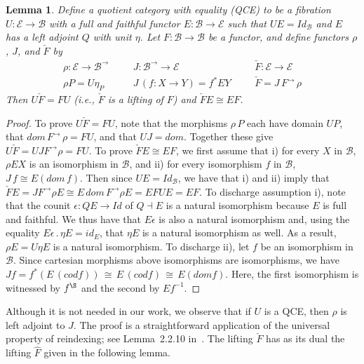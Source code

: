 \documentclass{LMCS}
\newcommand{\ra}{\rightarrow}
\newcommand{\cech}[1]{\check{#1}}
\newcommand\E{{\mathcal E}}
\newcommand\B{{\mathcal B}}
\theoremstyle{plain}
\newtheorem{lemma}[theorem]{Lemma}
\theoremstyle{remark}
\theoremstyle{definition}
\begin{document}
\begin{lemma}\label{lem:coindlift}
  Define a {\em quotient category with equality} (QCE) to be a
  fibration $U:\E\to\B$ with a full and faithful functor $E:\B\to\E$
  such that $U E = \mathit{Id}_\B$ and $E$ has a left adjoint $Q$ with
  unit $\eta$. Let $F : \B \to \B$ be a functor, and define functors
  $\rho$, $J$, and $\cech{F}$ by
\[\begin{array}{lll}
  \rho:\E\to\B^\to & \;\;\;\;\;\; J:\B^\to\to\E & \;\;\;\;\;\; \check
  F : \E\to\E\\ 
  \rho P = U \eta_P &\;\;\;\;\;\; J\,(f: X \ra Y) = f^*EY &
  \;\;\;\;\;\;\check F = J\, F^\ra \, \rho  
\end{array}\]
Then $U \check{F} = F U$ (i.e., $\cech F$ is a lifting of $F$) and
$\check{F} E \cong E F$.
\end{lemma}
\begin{proof}
  To prove $U\check{F} = FU$, note that the morphisms $\rho\,P$ each
  have domain $U P$, that $\mathit{dom}\, F^\ra\, \rho = F U$, and
  that $U J = \mathit{dom}$. Together these give $U \check{F} = U J
  F^\ra \rho = F U$.  To prove $\check{F} E \cong E F$, we first
  assume that i) for every $X$ in $\B$, $\rho E X$ is an isomorphism
  in $\B$, and ii) for every isomorphism $f$ in $\B$, $J\,f \cong
  E(\mathit{dom}\,f)$. Then since $U E = \mathit{Id}_\B$, we have that
  i) and ii) imply that $\check{F} E = J F^\ra \rho E \cong E\,
  \mathit{dom}\, F^\ra \rho E = E F U E = E F$. To discharge
  assumption i), note that the counit $\epsilon:QE\to Id$ of $Q\dashv
  E$ is a natural isomorphism because $E$ is full and faithful. We
  thus have that $E\epsilon$ is also a natural isomorphism and, using
  the equality $E \epsilon \, . \, \eta E = id_E$, that $\eta E$ is a
  natural isomorphism as well. As a result, $\rho E = U\eta E$ is a
  natural isomorphism.
To discharge ii), let $f$ be an isomorphism in $\B$. Since cartesian
morphisms above isomorphisms are isomorphisms, we have $J f = f^*(E \,
(\mathit{cod} f)) \, \cong \, E \, (\mathit{cod} f) \, \cong \, E
(\mathit{dom} f)$.
Here, the first isomorphism is witnessed by $f^\S$ and the second by
  $Ef^{-1}$.
\end{proof}

Although it is not needed in our work, we observe that if $U$ is a QCE,
then $\rho$ is left adjoint to $J$. The proof is a straightforward
application of the universal property of reindexing; see Lemma~2.2.10
in~\cite{fum12}. The lifting $\cech{F}$ has as its dual the lifting
$\hat{F}$ given in the following lemma.
\end{document}
